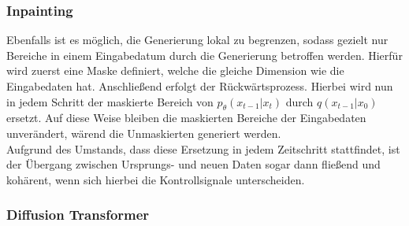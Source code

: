 \subsubsection{Inpainting}

Ebenfalls ist es möglich, die Generierung lokal zu begrenzen, sodass gezielt nur Bereiche in einem Eingabedatum durch die Generierung betroffen werden. Hierfür wird zuerst eine Maske definiert, welche die gleiche Dimension wie die Eingabedaten hat. Anschließend erfolgt der Rückwärtsprozess. Hierbei wird nun in jedem Schritt der maskierte Bereich von $p_\theta(x_{t-1} | x_{t})$ durch $q(x_{t-1}|x_0)$ ersetzt. Auf diese Weise bleiben die maskierten Bereiche der Eingabedaten unverändert, wärend die Unmaskierten generiert werden. \\
Aufgrund des Umstands, dass diese Ersetzung in jedem Zeitschritt stattfindet, ist der Übergang zwischen Ursprungs- und neuen Daten sogar dann fließend und kohärent, wenn sich hierbei die Kontrollsignale unterscheiden.

\subsubsection{Diffusion Transformer}
\label{subsubsec:DiT}

